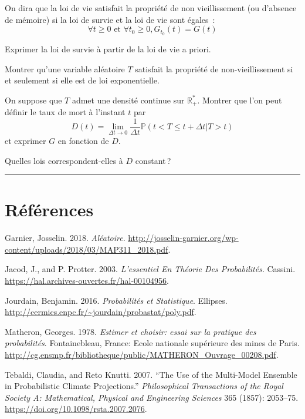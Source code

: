 On dira que la loi de vie satisfait la propriété de non vieillissement
(ou d'absence de mémoire) si la loi de survie et la loi de vie sont
égales~:
\[\forall t \geq 0 \text{ et } \forall t_0 \geq 0, G_{t_0}(t) = G(t)\]

\label{I-viemort1}
Exprimer la loi de survie à partir de la loi de vie a
priori.

\label{I-viemort2}
Montrer qu'une variable aléatoire \(T\) satisfait la propriété de
non-vieillissement si et seulement si elle est de loi
exponentielle.

\label{I-viemort3}
On suppose que \(T\) admet une densité continue sur
\(\mathbb{R}_+^\ast\). Montrer que l'on peut définir le taux de mort à
l'instant \(t\) par
\[D(t) = \lim_{\Delta t \to 0} \frac{1}{\Delta t}\mathbb{P}(t < T \leq t + \Delta t | T >t)\]
et exprimer \(G\) en fonction de \(D\).

Quelles lois correspondent-elles à \(D\) constant\,?

\begin{center}\rule{0.5\linewidth}{0.5pt}\end{center}



\chapter{Références}\label{I-ruxe9fuxe9rences}

\hypertarget{refs}{}
\begin{cslreferences}
\leavevmode\hypertarget{refI-polygarnier}{}%
Garnier, Josselin. 2018. \emph{Aléatoire}.
\url{http://josselin-garnier.org/wp-content/uploads/2018/03/MAP311_2018.pdf}.

\leavevmode\hypertarget{refI-Jacod}{}%
Jacod, J., and P. Protter. 2003. \emph{L'essentiel En Théorie Des
Probabilités}. Cassini.
\url{https://hal.archives-ouvertes.fr/hal-00104956}.

\leavevmode\hypertarget{refI-polyponts}{}%
Jourdain, Benjamin. 2016. \emph{Probabilités et Statistique}. Ellipses.
\url{http://cermics.enpc.fr/~jourdain/probastat/poly.pdf}.

\leavevmode\hypertarget{refI-matheron}{}%
Matheron, Georges. 1978. \emph{Estimer et choisir: essai sur la pratique
des probabilités}. Fontainebleau, France: Ecole nationale supérieure des
mines de Paris.
\url{http://cg.ensmp.fr/bibliotheque/public/MATHERON_Ouvrage_00208.pdf}.

\leavevmode\hypertarget{refI-tebaldi}{}%
Tebaldi, Claudia, and Reto Knutti. 2007. ``The Use of the Multi-Model
Ensemble in Probabilistic Climate Projections.'' \emph{Philosophical
Transactions of the Royal Society A: Mathematical, Physical and
Engineering Sciences} 365 (1857): 2053--75.
\url{https://doi.org/10.1098/rsta.2007.2076}.
\end{cslreferences}

